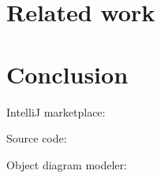 \documentclass[sigconf]{acmart}
\begin{document}
\section{Related work} \label{sec:relatedWork}

\section{Conclusion} \label{sec:conclusion}

IntelliJ marketplace: \cite{timkrauterVisualDebuggerIntelliJ2023}

Source code: \cite{timkrauterVisualDebuggerTool2023}

Object diagram modeler: \cite{timkrauterObjectDiagramModeler2023}




\end{document}
